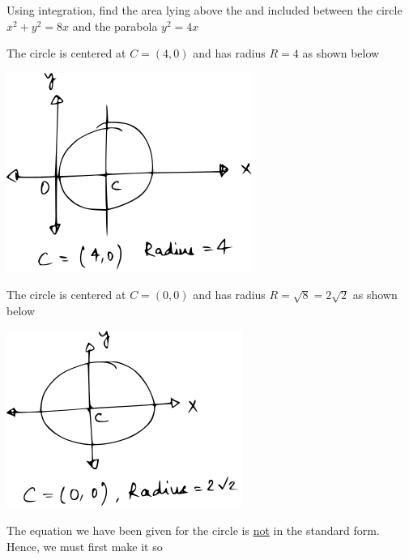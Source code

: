 \documentclass[14pt,fleqn]{extarticle}
\begin{document}
 

\begin{problem}
	\statement 
    
     Using integration, find the area lying above the \xaxis and included between the circle $x^2 + y^2 = 8x$ and the parabola $y^2 = 4x$ 
     
     \begin{step}
  \begin{options} 
     \correct 
       
     The circle is centered at $C = \left(4,0 \right)$ and has radius $R = 4$ as shown below 

     \begin{center}
\includegraphics[scale=1.2]{1381-A.svg}
\end{center}
     \incorrect
     
          The circle is centered at $C = \left(0,0 \right)$ and has radius $R = \sqrt{8} = 2\sqrt{2}$ as shown below 
        
        \begin{center}
\includegraphics[scale=1.2]{1381-B.svg}
\end{center}
    \end{options} 
     \reason 
     
     The equation we have been given for the circle is \underline{not} in the 
     standard form. Hence, we must first make it so
     

\end{step}
\end{problem}
\end{document}
